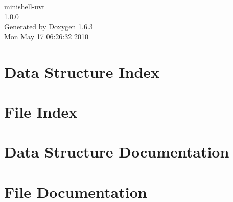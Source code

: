 \documentclass[a4paper]{book}
\begin{document}
\begin{titlepage}
\vspace*{7cm}
\begin{center}
{\Large minishell-\/uvt \\[1ex]\large 1.0.0 }\\
\vspace*{1cm}
{\large Generated by Doxygen 1.6.3}\\
\vspace*{0.5cm}
{\small Mon May 17 06:26:32 2010}\\
\end{center}
\end{titlepage}
\clearemptydoublepage
{}
\tableofcontents
\clearemptydoublepage
{}
\chapter{Data Structure Index}

\chapter{File Index}

\chapter{Data Structure Documentation}



\chapter{File Documentation}


























\printindex
\end{document}
